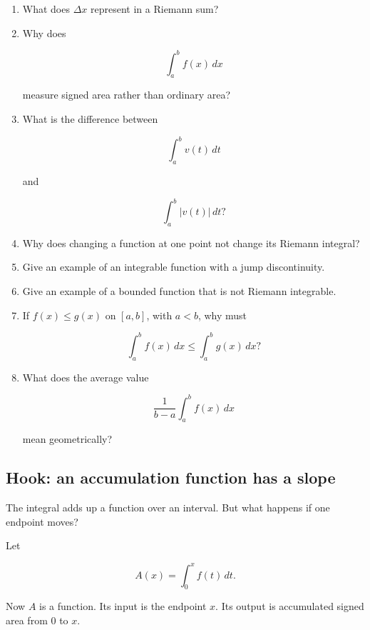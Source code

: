 \begin{enumerate}
\item What does \(\Delta x\) represent in a Riemann sum?

\item Why does

\[
\int_a^b f(x)\,dx
\]

measure signed area rather than ordinary area?

\item What is the difference between

\[
\int_a^b v(t)\,dt
\]

and

\[
\int_a^b |v(t)|\,dt?
\]

\item Why does changing a function at one point not change its Riemann integral?

\item Give an example of an integrable function with a jump discontinuity.

\item Give an example of a bounded function that is not Riemann integrable.

\item If \(f(x)\le g(x)\) on \([a,b]\), with \(a<b\), why must

\[
\int_a^b f(x)\,dx\le \int_a^b g(x)\,dx?
\]

\item What does the average value

\[
\frac1{b-a}\int_a^b f(x)\,dx
\]

mean geometrically?
\end{enumerate}

\subsection{Hook: an accumulation function has a slope}
\label{subsec:hook-accumulation-function-slope}

The integral adds up a function over an interval.  But what happens if one endpoint
moves?

Let

\[
A(x)=\int_0^x f(t)\,dt.
\]

Now \(A\) is a function.  Its input is the endpoint \(x\).  Its output is accumulated
signed area from \(0\) to \(x\).

